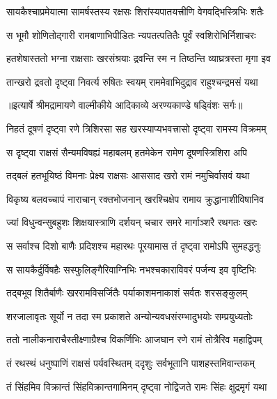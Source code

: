 \twolineshloka
{सायकैश्चाप्रमेयात्मा सामर्षस्तस्य रक्षसः}
{शिरांस्यपातयत्त्रीणि वेगवद्भिस्त्रिभिः शतैः} %

\twolineshloka
{स भूमौ शोणितोद्गारी रामबाणाभिपीडितः}
{न्यपतत्पतितैः पूर्वं स्वशिरोभिर्निशाचरः} %

\twolineshloka
{हतशेषास्ततो भग्ना राक्षसाः खरसंश्रयाः}
{द्रवन्ति स्म न तिष्ठन्ति व्याघ्रत्रस्ता मृगा इव} %

\twolineshloka
{तान्खरो द्रवतो दृष्ट्वा निवर्त्य रुषितः स्वयम्}
{राममेवाभिदुद्राव राहुश्चन्द्रमसं यथा} %


{॥इत्यार्षे श्रीमद्रामायणे वाल्मीकीये आदिकाव्ये अरण्यकाण्डे षड्विंशः सर्गः॥}


\twolineshloka
{निहतं दूषणं दृष्ट्वा रणे त्रिशिरसा सह}
{खरस्याप्यभवत्त्रासो दृष्ट्वा रामस्य विक्रमम्} %

\twolineshloka
{स दृष्ट्वा राक्षसं सैन्यमविषह्यं महाबलम्}
{हतमेकेन रामेण दूषणस्त्रिशिरा अपि} %

\twolineshloka
{तद्बलं हतभूयिष्ठं विमनाः प्रेक्ष्य राक्षसः}
{आससाद खरो रामं नमुचिर्वासवं यथा} %

\twolineshloka
{विकृष्य बलवच्चापं नाराचान् रक्तभोजनान्}
{खरश्चिक्षेप रामाय क्रुद्धानाशीविषानिव} %

\twolineshloka
{ज्यां विधुन्वन्सुबहुशः शिक्षयास्त्राणि दर्शयन्}
{चचार समरे मार्गाञ्शरै रथगतः खरः} %

\twolineshloka
{स सर्वाश्च दिशो बाणैः प्रदिशश्च महारथः}
{पूरयामास तं दृष्ट्वा रामोऽपि सुमहद्धनुः} %

\twolineshloka
{स सायकैर्दुर्विषहैः सस्फुलिङ्गैरिवाग्निभिः}
{नभश्चकाराविवरं पर्जन्य इव वृष्टिभिः} %

\twolineshloka
{तद्बभूव शितैर्बाणैः खररामविसर्जितैः}
{पर्याकाशमनाकाशं सर्वतः शरसङ्कुलम्} %

\twolineshloka
{शरजालावृतः सूर्यो न तदा स्म प्रकाशते}
{अन्योन्यवधसंरम्भादुभयोः सम्प्रयुध्यतोः} %

\twolineshloka
{ततो नालीकनाराचैस्तीक्ष्णाग्रैश्च विकर्णिभिः}
{आजघान रणे रामं तोत्रैरिव महाद्विपम्} %

\twolineshloka
{तं रथस्थं धनुष्पाणिं राक्षसं पर्यवस्थितम्}
{ददृशुः सर्वभूतानि पाशहस्तमिवान्तकम्} %

\twolineshloka
{तं सिंहमिव विक्रान्तं सिंहविक्रान्तगामिनम्}
{दृष्ट्वा नोद्विजते रामः सिंहः क्षुद्रमृगं यथा} %

